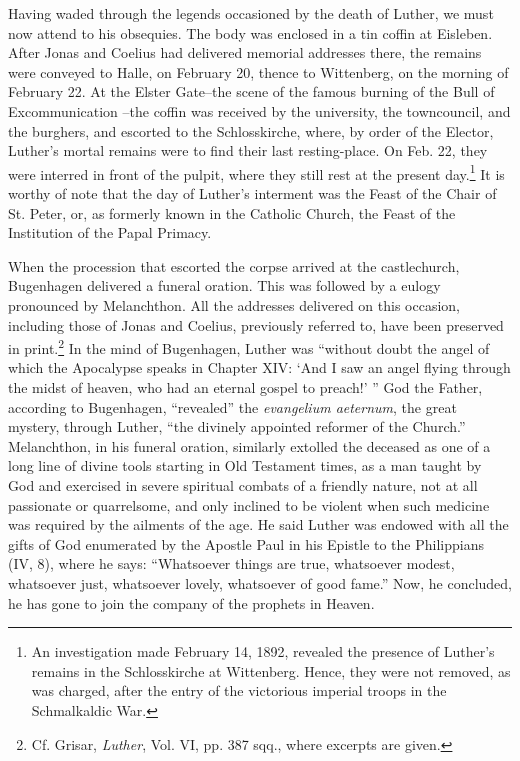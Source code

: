Having waded through the legends occasioned by the death of
Luther, we must now attend to his obsequies. The body was enclosed
in a tin coffin at Eisleben. After Jonas and Coelius had delivered memorial
addresses there, the remains were conveyed to Halle, on February 20, thence
to Wittenberg, on the morning of February 22. At
the Elster Gate--the scene of the famous burning of the Bull of Excommunication
--the coffin was received by the university, the towncouncil, and the
burghers, and escorted to the Schlosskirche, where, by
order of the Elector, Luther’s mortal remains were to find their last
resting-place. On Feb. 22, they were interred in front of the pulpit,
where they still rest at the present day.\footnote
{An investigation made February 14, 1892, revealed the presence of Luther’s remains
in the Schlosskirche at Wittenberg. Hence, they were not removed, as was charged, after
the entry of the victorious imperial troops in the Schmalkaldic War.}
It is worthy of note that the
day of Luther’s interment was the Feast of the Chair of St. Peter, or,
as formerly known in the Catholic Church, the Feast of the Institution
of the Papal Primacy.

When the procession that escorted the corpse arrived at the castlechurch,
Bugenhagen delivered a funeral oration. This was followed
by a eulogy pronounced by Melanchthon. All the addresses delivered
on this occasion, including those of Jonas and Coelius, previously referred
to, have been preserved in print.\footnote
{Cf. Grisar, \textit{Luther}, Vol. VI, pp. 387 sqq., where excerpts are given.}
In the mind of Bugenhagen,
Luther was “without doubt the angel of which the Apocalypse speaks
in Chapter XIV: ‘And I saw an angel flying through the midst of
heaven, who had an eternal gospel to preach!’ ” God the Father, according
to Bugenhagen, “revealed” the \textit{evangelium aeternum}, the
great mystery, through Luther, “the divinely appointed reformer of
the Church.” Melanchthon, in his funeral oration, similarly extolled
the deceased as one of a long line of divine tools starting in Old
Testament times, as a man taught by God and exercised in severe
spiritual combats of a friendly nature, not at all passionate or quarrelsome,
and only inclined to be violent when such medicine was required
by the ailments of the age. He said Luther was endowed with
all the gifts of God enumerated by the Apostle Paul in his Epistle to
the Philippians (IV, 8), where he says: “Whatsoever things are true,
whatsoever modest, whatsoever just, whatsoever lovely, whatsoever
of good fame.” Now, he concluded, he has gone to join the company
of the prophets in Heaven.

